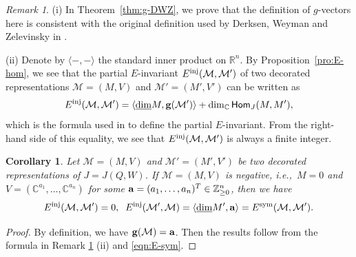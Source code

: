 \documentclass[12pt]{amsart}
\newtheorem{corollary}[theorem]{Corollary}
\theoremstyle{definition}
\theoremstyle{remark}
\newtheorem{remark}[theorem]{Remark}
\numberwithin{equation}{section}
\newcommand{\opname}[1]{\operatorname{\mathsf{#1}}}
\newcommand{\Hom}{\opname{Hom}}
\newcommand{\ie}{\textit{i.e.,}\ }
\begin{document}
\begin{remark}\label{rmk:def-DWZ}
(i)  In Theorem~\ref{thm:g-DWZ}, we prove that the definition of $g$-vectors  here is consistent with the original definition used by Derksen, Weyman and Zelevinsky in 
\cite{DWZ10}.

(ii) Denote by $\langle-,-\rangle$ the standard inner product on $\mathbb R^n$. By  Proposition~\ref{pro:E-hom}, we see that the partial $E$-invariant $E^{\rm inj}(\mathcal M,\mathcal M')$ of two decorated representations $\mathcal M=(M,V)$ and $\mathcal M'=(M', V')$ can be written as
\[ E^{\rm inj}(\mathcal M,\mathcal M')=\langle\underline{\dim} M, \mathbf{g}(\mathcal{M}')\rangle + \dim_{\mathbb C} \Hom_J(M, M' ),
\]
which is the formula used in \cite[\S7]{DWZ10} to define the partial $E$-invariant. From the right-hand side of this equality, we see that $E^{\rm inj}(\mathcal M,\mathcal M')$ is always a finite integer.
\end{remark}


\begin{corollary}\label{cor:E-inv}
 Let $\mathcal M=(M,V)$ and  $\mathcal M'=(M',V')$ be two decorated representations of $J=J(Q,W)$. If 
 $\mathcal M=(M,V)$ is negative,  \ie $M=0$ and  $V=(\mathbb C^{a_1},\ldots,\mathbb C^{a_n})$ for some ${\bf a}=(a_1,\ldots,a_n)^T\in\mathbb Z_{\geq 0}^n$, then we have
 \[
E^{\rm inj}(\mathcal M,\mathcal M')=0,\;\;
 E^{\rm inj}(\mathcal M',\mathcal M)=\langle \underline{\dim} M', {\bf a}\rangle=E^{\rm sym}(\mathcal M,\mathcal M').
 \]
\end{corollary}
\begin{proof}
By definition, we have ${\bf g}(\mathcal M)={\bf a}$. Then the results follow from the formula in Remark \ref{rmk:def-DWZ} (ii) and \eqref{eqn:E-sym}.
\end{proof}
\end{document}
